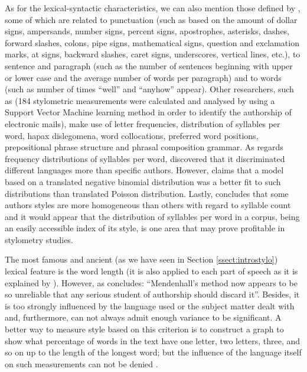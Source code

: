 As for the lexical-syntactic characteristics, we can also mention those defined by \cite{calix2008stylometry}, some of which are related to punctuation (such as based on the amount of dollar signs, ampersands, number signs, percent signs, apostrophes, asterisks, dashes, forward slashes, colons, pipe signs, mathematical signs, question and exclamation marks, at signs, backward slashes, caret signs, underscores, vertical lines, etc.), to sentence and paragraph (such as the number of sentences beginning with upper or lower case and the average number of words per paragraph) and to words (such as number of times ``well'' and ``anyhow'' appear). Other researchers, such as \cite{corney2001identifying} (184 stylometric measurements were calculated and analysed by using a Support Vector Machine learning method in order to identify the authorship of electronic mails), make use of letter frequencies, distribution of syllables per word, hapax dislegomena, word collocations, preferred word positions, prepositional phrase structure and phrasal composition grammar. As regards frequency distributions of syllables per word, \cite{fucks1965mathematische} discovered that it discriminated different languages more than specific authors. However, \cite{brainerd1974weighting} claims that a model based on a translated negative binomial distribution was a better fit to such distributions than \cite{fucks1965mathematische} translated Poisson distribution. Lastly, \cite{brainerd1974weighting} concludes that some authors styles are more homogeneous than others with regard to syllable count and it would appear that the distribution of syllables per word in a corpus, being an easily accessible index of its style, is one area that may prove profitable in stylometry studies.

The most famous and ancient (as we have seen in Section \ref{ssect:introstylo}) lexical feature is the word length (it is also applied to each part of speech as it is explained by \cite{allen1974methods}). However, as \cite{smith1983recent} concludes: ``Mendenhall's method now appears to be so unreliable that any serious student of authorship should discard it''. Besides, it is too strongly influenced by the language used or the subject matter dealt with and, furthermore, can not always admit enough variance to be significant. A better way to measure style based on this criterion is to construct a graph to show what percentage of words in the text have one letter, two letters, three, and so on up to the length of the longest word; but the influence of the language itself on such measurements can not be denied \citep{williams1970style}.

